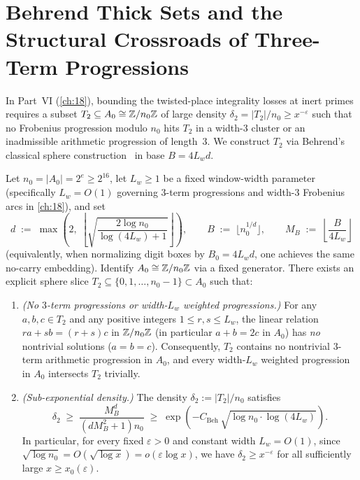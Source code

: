 \section{Behrend Thick Sets and the Structural Crossroads of Three-Term Progressions}
\label{sec:04:behrend}

In Part~VI (\cref{ch:18}), bounding the twisted-place integrality losses at inert primes requires a subset $T_2 \subseteq A_0 \cong \mathbb{Z}/n_0\mathbb{Z}$ of large density $\delta_2 = |T_2|/n_0 \ge x^{-\varepsilon}$ such that no Frobenius progression modulo $n_0$ hits $T_2$ in a width-$3$ cluster or an inadmissible arithmetic progression of length~$3$. We construct $T_2$ via Behrend's classical sphere construction~\cite{Behrend1946} in base $B = 4 L_w d$.

\begin{proposition}[Behrend sphere construction of $T_2$ with explicit base $B = 4 L_w d$]
\label{prop:04:behrend}
Let $n_0 = |A_0| = 2^e \ge 2^{16}$, let $L_w \ge 1$ be a fixed window-width parameter (specifically $L_w = O(1)$ governing $3$-term progressions and width-$3$ Frobenius arcs in \cref{ch:18}), and set
\begin{equation}
\label{eq:04:behrend-params}
  d \;:=\; \max\!\left(2,\; \left\lfloor \sqrt{\frac{2\log n_0}{\log(4 L_w) + 1}} \right\rfloor\right), \qquad
  B \;:=\; \bigl\lfloor n_0^{1/d} \bigr\rfloor, \qquad
  M_B \;:=\; \left\lfloor \frac{B}{4 L_w} \right\rfloor
\end{equation}
(equivalently, when normalizing digit boxes by $B_0 = 4 L_w d$, one achieves the same no-carry embedding). Identify $A_0 \cong \mathbb{Z}/n_0\mathbb{Z}$ via a fixed generator. There exists an explicit sphere slice $T_2 \subseteq \{0, 1, \dots, n_0 - 1\} \subset A_0$ such that:
\begin{enumerate}[label=\textup{(\roman*)}]
\item \emph{(No $3$-term progressions or width-$L_w$ weighted progressions.)} For any $a, b, c \in T_2$ and any positive integers $1 \le r, s \le L_w$, the linear relation $r a + s b = (r + s) c$ in $\mathbb{Z}/n_0\mathbb{Z}$ (in particular $a + b = 2c$ in $A_0$) has \emph{no} nontrivial solutions ($a = b = c$). Consequently, $T_2$ contains no nontrivial $3$-term arithmetic progression in $A_0$, and every width-$L_w$ weighted progression in $A_0$ intersects $T_2$ trivially.
\item \emph{(Sub-exponential density.)} The density $\delta_2 := |T_2| / n_0$ satisfies
  \begin{equation}
  \label{eq:04:behrend-density}
    \delta_2 \;\ge\; \frac{M_B^d}{(d M_B^2 + 1) n_0} \;\ge\; \exp\!\left(-C_{\mathrm{Beh}}\,\sqrt{\log n_0 \cdot \log(4 L_w)}\right).
  \end{equation}
  In particular, for every fixed $\varepsilon > 0$ and constant width $L_w = O(1)$, since $\sqrt{\log n_0} = O(\sqrt{\log x}) = o(\varepsilon \log x)$, we have $\delta_2 \ge x^{-\varepsilon}$ for all sufficiently large $x \ge x_0(\varepsilon)$.
\end{enumerate}
\end{proposition}
